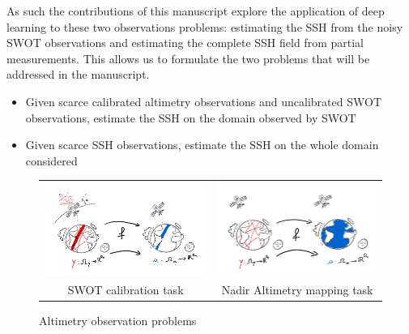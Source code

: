 \begin{bibunit}
  As such the contributions of this manuscript explore the application of deep learning to these two observations problems: estimating the SSH from the noisy SWOT observations and estimating the complete SSH field from partial measurements.
  This allows us to formulate the two problems that will be addressed in the manuscript.
  \begin{itemize}
      \item Given scarce calibrated altimetry observations and uncalibrated SWOT observations, estimate the SSH on the domain observed by SWOT
      \item Given scarce SSH observations, estimate the SSH on the whole domain considered
  \end{itemize}
  \begin{figure}
      \centering
          \begin{tabular}{c|c}
            \hspace{-0.2\linewidth}\includegraphics[width=0.7\linewidth]{Introduction/pics/calib_task.png}   & 
            \includegraphics[width=0.7\linewidth]{Introduction/pics/mapping_task.png}\\
           \hspace{-0.2\linewidth} SWOT calibration task & Nadir Altimetry mapping task \\
          \end{tabular}
      \caption{Altimetry observation problems}
      \label{fig:altimetry task}
  \end{figure}


\end{bibunit}
